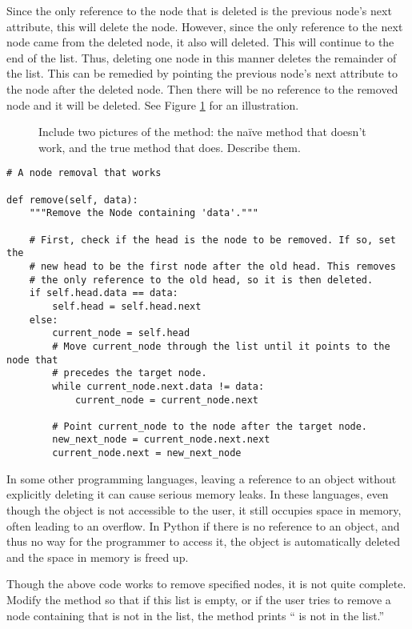 Since the only reference to the node that is deleted is the previous node's next attribute, this will delete the node.
However, since the only reference to the next node came from the deleted node, it also will deleted.
This will continue to the end of the list.
Thus, deleting one node in this manner deletes the remainder of the list.
This can be remedied by pointing the previous node's next attribute to the node after the deleted node.
Then there will be no reference to the removed node and it will be deleted. 
See Figure \ref{fig:remove} for an illustration.

\begin{figure}
\centering
\caption{Include two pictures of the  method: the na{\"i}ve method that doesn't work, and the true method that does. Describe them.}
\label{fig:remove}
\end{figure}


\begin{lstlisting}
# A node removal that works

def remove(self, data):
	"""Remove the Node containing 'data'."""

	# First, check if the head is the node to be removed. If so, set the
	# new head to be the first node after the old head. This removes
	# the only reference to the old head, so it is then deleted.
	if self.head.data == data:
		self.head = self.head.next
	else:
		current_node = self.head
		# Move current_node through the list until it points to the node that
		# precedes the target node.
		while current_node.next.data != data:
			current_node = current_node.next
	
		# Point current_node to the node after the target node.
		new_next_node = current_node.next.next
		current_node.next = new_next_node
\end{lstlisting}

\begin{warn}
In some other programming languages, leaving a reference to an object without explicitly deleting it can cause serious memory leaks.
In these languages, even though the object is not accessible to the user, it still occupies space in memory, often leading to an overflow.
In Python if there is no reference to an object, and thus no way for the programmer to access it, the object is automatically deleted and the space in memory is freed up.
\end{warn}

\begin{problem}
Though the above code works to remove specified nodes, it is not quite complete.
Modify the  method so that if this list is empty, or if the user tries to remove a node containing  that is not in the list, the method prints `` is not in the list.''
\end{problem}

